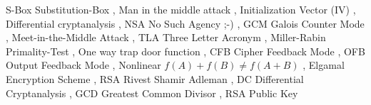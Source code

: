 \documentclass[
  10pt,
  a4paper,
]{article}
\begin{document}
\begin{multicols*}{2}
S-Box Substitution-Box {\vspace{2mm}\color{NavyBlue!70},\vspace{2mm}}
Man in the middle attack {\vspace{2mm}\color{NavyBlue!70},\vspace{2mm}}
Initialization Vector (IV)
{\vspace{2mm}\color{NavyBlue!70},\vspace{2mm}} Differential
cryptanalysis {\vspace{2mm}\color{NavyBlue!70},\vspace{2mm}} NSA No Such
Agency ;-) {\vspace{2mm}\color{NavyBlue!70},\vspace{2mm}} GCM Galois
Counter Mode {\vspace{2mm}\color{NavyBlue!70},\vspace{2mm}}
Meet-in-the-Middle Attack {\vspace{2mm}\color{NavyBlue!70},\vspace{2mm}}
TLA Three Letter Acronym {\vspace{2mm}\color{NavyBlue!70},\vspace{2mm}}
Miller-Rabin Primality-Test
{\vspace{2mm}\color{NavyBlue!70},\vspace{2mm}} One way trap door
function {\vspace{2mm}\color{NavyBlue!70},\vspace{2mm}} CFB Cipher
Feedback Mode {\vspace{2mm}\color{NavyBlue!70},\vspace{2mm}} OFB Output
Feedback Mode {\vspace{2mm}\color{NavyBlue!70},\vspace{2mm}} Nonlinear
\(f(A)+f(B)\neq f(A+B)\) {\vspace{2mm}\color{NavyBlue!70},\vspace{2mm}}
Elgamal Encryption Scheme {\vspace{2mm}\color{NavyBlue!70},\vspace{2mm}}
RSA Rivest Shamir Adleman {\vspace{2mm}\color{NavyBlue!70},\vspace{2mm}}
DC Differential Cryptanalysis
{\vspace{2mm}\color{NavyBlue!70},\vspace{2mm}} GCD Greatest Common
Divisor {\vspace{2mm}\color{NavyBlue!70},\vspace{2mm}} RSA Public Key

\end{multicols*}
\end{document}
